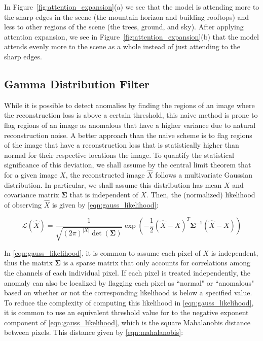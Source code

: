 \documentclass[12pt]{article}
\begin{document}
In Figure~\ref{fig:attention_expansion}(a) we see that the model is attending more to the sharp edges in the scene (the mountain horizon and building rooftops) and less to other regions of the scene (the trees, ground, and sky). After applying attention expansion, we see in Figure~\ref{fig:attention_expansion}(b) that the model attends evenly more to the scene as a whole instead of just attending to the sharp edges.

\subsection{Gamma Distribution Filter}

While it is possible to detect anomalies by finding the regions of an image where the reconstruction loss is above a certain threshold, this naive method is prone to flag regions of an image as anomalous that have a higher variance due to natural reconstruction noise. A better approach than the naive scheme is to flag regions of the image that have a reconstruction loss that is statistically higher than normal for their respective locations the image. To quantify the statistical significance of this deviation, we shall assume by the central limit theorem that for a given image $X$, the reconstructed image $\hat{X}$ follows a multivariate Gaussian distribution. In particular, we shall assume this distribution has mean $X$ and covariance matrix $\mathbf{\Sigma}$ that is independent of $X$. Then, the (normalized) likelihood of observing $\hat{X}$ is given by \eqref{eqn:gauss_likelihood}:

\begin{equation}
\mathcal{L}(\hat{X}) = \frac{1}{\sqrt{(2\pi)^{|X|} \det(\mathbf{\Sigma})}}\exp\left(-\frac{1}{2}(\hat{X} - X)^T\mathbf{\Sigma}^{-1}(\hat{X} - X)\right)
\label{eqn:gauss_likelihood}
\end{equation}

In \eqref{eqn:gauss_likelihood}, it is common to assume each pixel of $X$ is independent, thus the matrix $\mathbf{\Sigma}$ is a sparse matrix that only accounts for correlations among the channels of each individual pixel. If each pixel is treated independently, the anomaly can also be localized by flagging each pixel as ``normal" or ``anomalous" based on whether or not the corresponding likelihood is below a specified value. To reduce the complexity of computing this likelihood in \eqref{eqn:gauss_likelihood}, it is common to use an equivalent threshold value for to the negative exponent component of \eqref{eqn:gauss_likelihood}, which is the square Mahalanobis distance between pixels. This distance given by \eqref{eqn:mahalanobis}:
\end{document}
